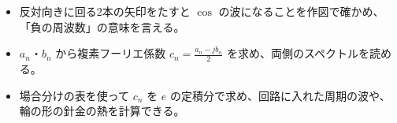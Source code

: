 \newcommand\kixdzero[3][kixdP]{\draw[#1, line width=1.1pt, fill=white] (axis cs:#2,#3) circle[radius=1.2mm];}
\newcommand\kixdhead[1]{\par\addvspace{6pt}\Needspace{6\baselineskip}\noindent{\sffamily\bfseries\color{\bkTT}#1}\par\nobreak\vspace{2pt}\noindent\ignorespaces}
\newcommand\kixdbox[1]{\par\addvspace{3pt}\noindent\textbf{#1}\par\vspace{3pt}\noindent\ignorespaces}
\newcommand\kixdline[1]{\par\addvspace{3pt}{\centering #1\par}\addvspace{3pt}\noindent\ignorespaces}
\newcommand\kixdframe[2][100mm]{\par\addvspace{4pt}{\centering\tikz\node[draw=\bkTT, line width=0.9pt, fill=bkTheme!6, rounded corners=1.5mm, inner xsep=6mm, inner ysep=2.5mm, align=center]{#2};\par}\addvspace{4pt}\noindent\ignorespaces}
\newcommand\kixda{\par\vspace{2pt}\noindent\rightskip=0pt plus 8em\relax\hangindent=2.6\zw\hangafter=0\relax}
\newcommand\kixdb{\par\vspace{2pt}\noindent\rightskip=0pt plus 8em\relax\hangindent=4.3\zw\hangafter=0\relax}
\newcommand\kixds{\rightskip=0pt plus 8em\relax}
\newcommand\kixdaxes[4]{%
  \draw[bkInk, line width=0.7pt, -{Stealth[length=2mm]}] (#1,0) -- (#2,0);
  \draw[bkInk, line width=0.7pt, -{Stealth[length=2mm]}] (0,#3) -- (0,#4);
  \node[font=\footnotesize, anchor=north west, inner sep=1pt] at (#2,-0.8) {実部};
  \node[font=\footnotesize, anchor=south west, inner sep=1pt] at (0.8,#4) {虚部};}
\newcommand\kixdstem[3]{\draw[#3, line width=1.6pt] (#1,0) -- (#1,#2); \fill[#3] (#1,#2) circle (0.9);}
\makeatother


\begin{goal}
\begin{itemize}[label={\color{\bkTT}●}, leftmargin=1.6\zw, itemsep=0pt, topsep=1pt]
\item {}\enspace 反対向きに回る2本の矢印をたすと $\cos$ の波になることを作図で確かめ、「負の周波数」の意味を言える。
\item {}\enspace $a_n$・$b_n$ から複素フーリエ係数 $c_n=\tfrac{a_n-jb_n}{2}$ を求め、両側のスペクトルを読める。
\item {}\enspace 場合分けの表を使って $c_n$ を $e$ の定積分で求め、回路に入れた周期の波や、輪の形の針金の熱を計算できる。
\end{itemize}
\end{goal}


